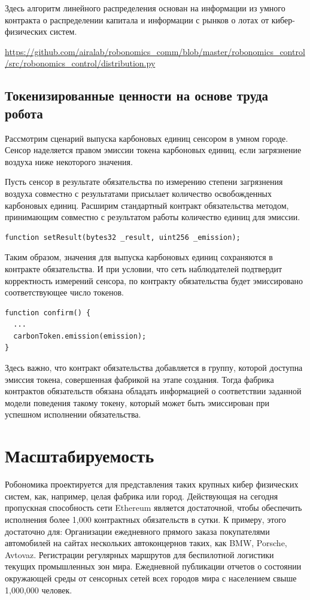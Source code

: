 \documentclass{article}
\begin{document}
Здесь алгоритм линейного распределения основан на информации из умного контракта о распределении капитала и информации с рынков о лотах от кибер-физических систем. 

\url{https://github.com/airalab/robonomics_comm/blob/master/robonomics_control/src/robonomics_control/distribution.py}

\subsection{Токенизированные ценности на основе труда робота}

Рассмотрим сценарий выпуска карбоновых единиц сенсором в умном городе. Сенсор наделяется правом эмиссии токена карбоновых единиц, если загрязнение воздуха ниже некоторого значения.

Пусть сенсор в результате обязательства по измерению степени загрязнения воздуха совместно с результатами присылает количество освобожденных карбоновых единиц. Расширим стандартный контракт обязательства методом, принимающим совместно с результатом работы количество единиц для эмиссии.
\begin{lstlisting}
function setResult(bytes32 _result, uint256 _emission);
\end{lstlisting}


Таким образом, значения для выпуска карбоновых единиц сохраняются в контракте обязательства. И при условии, что сеть наблюдателей подтвердит корректность измерений сенсора, по контракту обязательства будет эмиссировано соответствующее число токенов.

\begin{lstlisting}
function confirm() {
  ... 
  carbonToken.emission(emission);
}
\end{lstlisting}

Здесь важно, что контракт обязательства добавляется в группу, которой доступна эмиссия токена, совершенная фабрикой на этапе создания. Тогда фабрика контрактов обязательств обязана обладать информацией о соответствии заданной модели поведения такому токену, который может быть эмиссирован при успешном исполнении обязательства.

\section{Масштабируемость}

Робономика проектируется для представления таких крупных кибер физических систем, как, например, целая фабрика или город. Действующая на сегодня пропускная способность сети Ethereum является достаточной, чтобы обеспечить исполнения более 1,000 контрактных обязательств в сутки. К примеру, этого достаточно для:
Организации ежедневного прямого заказа покупателями автомобилей на сайтах нескольких автоконцернов таких, как BMW, Porsche, Avtovaz.
Регистрации регулярных маршрутов для беспилотной логистики текущих промышленных зон мира.
Ежедневной публикации отчетов о состоянии окружающей среды от сенсорных сетей всех городов мира с населением свыше 1,000,000 человек.
\end{document}
